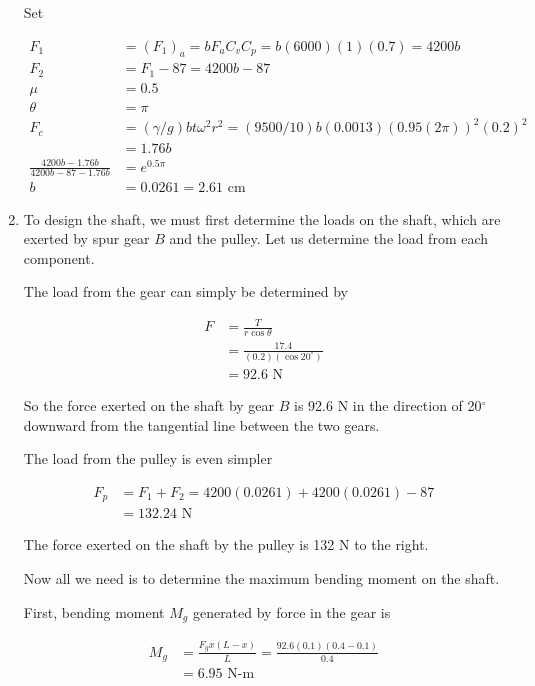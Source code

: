 \documentclass[a4paper,openany,svgnames]{kaobook}
\begin{document}
\begin{enumerate}
Set

\begin{align*}
     F_{1} &= (F_{1})_{a} = bF_{a}C_{v}C_{p} = b(6000)(1)(0.7) = 4200b \\
     F_{2} &= F_{1} - 87 = 4200b - 87 \\
     \mu &= 0.5 \\
     \theta &= \pi \\
     F_{c} &= (\gamma/g)bt \omega^{2} r^{2} = (9500/10)b(0.0013)(0.95(2\pi))^{2}(0.2)^{2} \\
        &= 1.76b \\
     \frac{4200b - 1.76b}{4200b - 87 - 1.76b} &= e^{0.5 \pi} \\
     b &= 0.0261 = 2.61 \text{ cm}
   \end{align*}

\item To design the shaft, we must first determine the loads on the shaft, which are exerted by spur gear \(B\) and the pulley. Let us determine the load from each component.

The load from the gear can simply be determined by

\begin{align*}
     F &= \frac{T}{r \cos \theta} \\
       &= \frac{17.4}{(0.2)(\cos 20^{\circ})} \\
       &= 92.6 \text{ N}
   \end{align*}

So the force exerted on the shaft by gear \(B\) is 92.6 N in the direction of 20\(^{\circ}\) downward from the tangential line between the two gears.

The load from the pulley is even simpler

\begin{align*}
     F_{p} &= F_{1} + F_{2} = 4200(0.0261) + 4200(0.0261) - 87 \\
           &= 132.24 \text{ N}
   \end{align*}

The force exerted on the shaft by the pulley is 132 N to the right.

Now all we need is to determine the maximum bending moment on the
shaft.

First, bending moment \(M_{g}\) generated by force in the gear is

\begin{align*}
     M_{g} &= \frac{F_{g}x(L-x)}{L} = \frac{92.6(0.1)(0.4-0.1)}{0.4} \\
           &= 6.95 \text{ N-m}
   \end{align*}


\end{enumerate}
\end{document}
